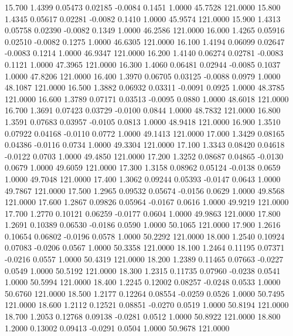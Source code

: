   15.700   1.4399   0.05473   0.02185  -0.0084   0.1451   1.0000  45.7528 121.0000
  15.800   1.4345   0.05617   0.02281  -0.0082   0.1410   1.0000  45.9574 121.0000
  15.900   1.4313   0.05758   0.02390  -0.0082   0.1349   1.0000  46.2586 121.0000
  16.000   1.4265   0.05916   0.02510  -0.0082   0.1275   1.0000  46.6305 121.0000
  16.100   1.4194   0.06099   0.02647  -0.0083   0.1214   1.0000  46.9347 121.0000
  16.200   1.4140   0.06274   0.02781  -0.0083   0.1121   1.0000  47.3965 121.0000
  16.300   1.4060   0.06481   0.02944  -0.0085   0.1037   1.0000  47.8206 121.0000
  16.400   1.3970   0.06705   0.03125  -0.0088   0.0979   1.0000  48.1087 121.0000
  16.500   1.3882   0.06932   0.03311  -0.0091   0.0925   1.0000  48.3785 121.0000
  16.600   1.3789   0.07171   0.03513  -0.0095   0.0880   1.0000  48.6018 121.0000
  16.700   1.3691   0.07423   0.03729  -0.0100   0.0844   1.0000  48.7832 121.0000
  16.800   1.3591   0.07683   0.03957  -0.0105   0.0813   1.0000  48.9418 121.0000
  16.900   1.3510   0.07922   0.04168  -0.0110   0.0772   1.0000  49.1413 121.0000
  17.000   1.3429   0.08165   0.04386  -0.0116   0.0734   1.0000  49.3304 121.0000
  17.100   1.3343   0.08420   0.04618  -0.0122   0.0703   1.0000  49.4850 121.0000
  17.200   1.3252   0.08687   0.04865  -0.0130   0.0679   1.0000  49.6059 121.0000
  17.300   1.3158   0.08962   0.05124  -0.0138   0.0659   1.0000  49.7048 121.0000
  17.400   1.3062   0.09244   0.05393  -0.0147   0.0643   1.0000  49.7867 121.0000
  17.500   1.2965   0.09532   0.05674  -0.0156   0.0629   1.0000  49.8568 121.0000
  17.600   1.2867   0.09826   0.05964  -0.0167   0.0616   1.0000  49.9219 121.0000
  17.700   1.2770   0.10121   0.06259  -0.0177   0.0604   1.0000  49.9863 121.0000
  17.800   1.2691   0.10389   0.06530  -0.0186   0.0590   1.0000  50.1065 121.0000
  17.900   1.2616   0.10654   0.06802  -0.0196   0.0578   1.0000  50.2292 121.0000
  18.000   1.2540   0.10924   0.07083  -0.0206   0.0567   1.0000  50.3358 121.0000
  18.100   1.2464   0.11195   0.07371  -0.0216   0.0557   1.0000  50.4319 121.0000
  18.200   1.2389   0.11465   0.07663  -0.0227   0.0549   1.0000  50.5192 121.0000
  18.300   1.2315   0.11735   0.07960  -0.0238   0.0541   1.0000  50.5994 121.0000
  18.400   1.2245   0.12002   0.08257  -0.0248   0.0533   1.0000  50.6760 121.0000
  18.500   1.2177   0.12264   0.08554  -0.0259   0.0526   1.0000  50.7495 121.0000
  18.600   1.2112   0.12521   0.08851  -0.0270   0.0519   1.0000  50.8194 121.0000
  18.700   1.2053   0.12768   0.09138  -0.0281   0.0512   1.0000  50.8922 121.0000
  18.800   1.2000   0.13002   0.09413  -0.0291   0.0504   1.0000  50.9678 121.0000
